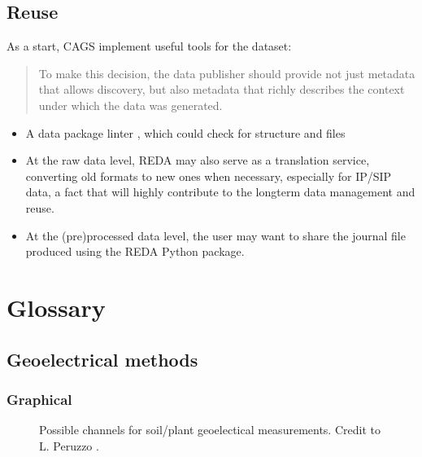 \documentclass[letterpaper,10pt,english]{sphinxmanual}
\begin{document}
\section{Reuse}
\label{\detokenize{FAIR:reuse}}
As a start, CAGS implement useful tools for the dataset:
\begin{quote}

To make this decision, the data publisher should provide not just metadata that allows discovery, but also metadata that richly describes the context under which the data was generated.
\end{quote}
\begin{itemize}
\item {} 
A data package linter , which could check for structure and files

\item {} 
At the raw data level, REDA may also serve as a translation service, converting old formats to new ones when necessary, especially for IP/SIP data, a fact that will highly contribute to the long\sphinxhyphen{}term data management and reuse.

\item {} 
At the (pre)\sphinxhyphen{}processed data level, the user may want to share the journal file produced using the REDA Python package.

\end{itemize}


\chapter{Glossary}
\label{\detokenize{glossary:glossary}}\label{\detokenize{glossary::doc}}

\section{Geoelectrical methods}
\label{\detokenize{glossary:geoelectrical-methods}}

\subsection{Graphical}
\label{\detokenize{glossary:graphical}}
\begin{figure}[htbp]
\centering
\capstart

\noindent{}
\caption{Possible channels for soil/plant geoelectical measurements. Credit to L. Peruzzo .}\label{\detokenize{glossary:id3}}\label{\detokenize{glossary:importing}}\end{figure}
\end{document}
